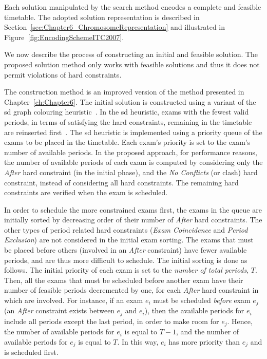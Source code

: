 Each solution manipulated by the search method encodes a complete and feasible timetable. The adopted solution representation is described in Section~\ref{sec:Chapter6_ChromosomeRepresentation} and illustrated in Figure~\ref{fig:EncodingSchemeITC2007}. 


We now describe the process of constructing an initial and feasible solution. The proposed solution method only works with feasible solutions and thus it does not permit violations of hard constraints.

The construction method is an improved version of the method presented in Chapter~\ref{ch:Chapter6}. The initial solution is constructed using a variant of the \gls{sd} graph colouring heuristic~\citep{Brelaz1979,Cheong2009}. In the \gls{sd} heuristic, exams with the fewest valid periods, in terms of satisfying the hard constraints, remaining in the timetable are reinserted first~\citep{Cheong2009}. The \gls{sd} heuristic is implemented using a priority queue of the exams to be placed in the timetable. Each exam's priority is set to the exam's number of available periods. In the proposed approach, for performance reasons, the number of available periods of each exam is computed by considering only the \textit{After} hard constraint (in the initial phase), and the \textit{No Conflicts} (or clash) hard constraint, instead of considering all hard constraints. The remaining hard constraints are verified when the exam is scheduled. 

In order to schedule the more constrained exams first, the exams in the queue are initially sorted by decreasing order of their number of \textit{After} hard constraints. The other types of period related hard constraints (\textit{Exam Coincidence} and \textit{Period Exclusion}) are not considered in the initial exam sorting. The exams that must be placed before others (involved in an \textit{After} constraint) have fewer available periods, and are thus more difficult to schedule. The initial sorting is done as follows. The initial priority of each exam is set to the \textit{number of total periods}, $T$. Then, all the exams that must be scheduled before another exam have their number of feasible periods decremented by one, for each \textit{After} hard constraint in which are involved. For instance, if an exam $e_i$ must be scheduled \textit{before} exam $e_j$ (an \textit{After} constraint exists between $e_j$ and $e_i$), then the available periods for $e_i$ include all periods except the last period, in order to make room for $e_j$. Hence, the number of available periods for $e_i$ is equal to $T-1$, and the number of available periods for $e_j$ is equal to $T$. In this way, $e_i$ has more priority than $e_j$ and is scheduled first. 


